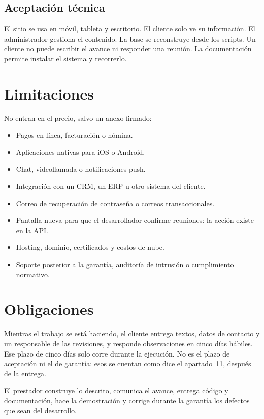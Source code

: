 \subsection{Aceptación técnica}

El sitio se usa en móvil, tableta y escritorio. El cliente solo ve su
información. El administrador gestiona el contenido. La base se reconstruye
desde los scripts. Un cliente no puede escribir el avance ni responder una
reunión. La documentación permite instalar el sistema y recorrerlo.

\section{Limitaciones}

No entran en el precio, salvo un anexo firmado:

\begin{itemize}
  \item Pagos en línea, facturación o nómina.
  \item Aplicaciones nativas para iOS o Android.
  \item Chat, videollamada o notificaciones push.
  \item Integración con un CRM, un ERP u otro sistema del cliente.
  \item Correo de recuperación de contraseña o correos transaccionales.
  \item Pantalla nueva para que el desarrollador confirme reuniones: la acción existe en la API.
  \item Hosting, dominio, certificados y costos de nube.
  \item Soporte posterior a la garantía, auditoría de intrusión o cumplimiento normativo.
\end{itemize}

\section{Obligaciones}

Mientras el trabajo se está haciendo, el cliente entrega textos, datos de
contacto y un responsable de las revisiones, y responde observaciones en cinco
días hábiles. Ese plazo de cinco días solo corre durante la ejecución. No es
el plazo de aceptación ni el de garantía: esos se cuentan como dice el
apartado~11, después de la entrega.

El prestador construye lo descrito, comunica el avance, entrega código y
documentación, hace la demostración y corrige durante la garantía los defectos
que sean del desarrollo.

